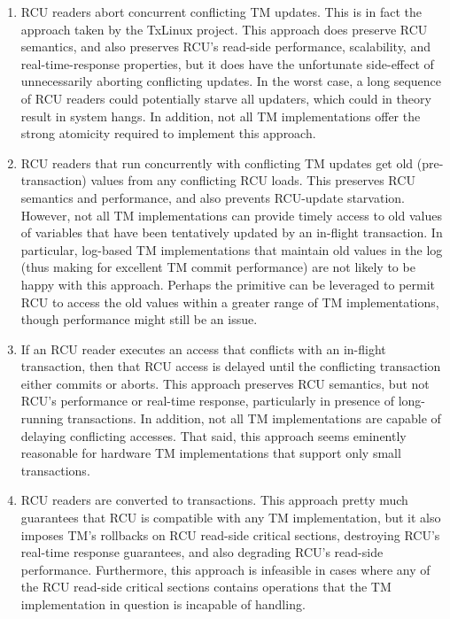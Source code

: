 \begin{enumerate}
\item	RCU readers abort concurrent conflicting TM updates.
	This is in fact the approach taken by the TxLinux project.
	This approach does preserve RCU semantics, and also preserves
	RCU's read-side performance, scalability, and real-time-response
	properties, but it does have the unfortunate side-effect of
	unnecessarily aborting conflicting updates.
	In the worst case, a long sequence of RCU readers could
	potentially starve all updaters, which could in theory result
	in system hangs.
	In addition, not all TM implementations offer the strong atomicity
	required to implement this approach.
\item	RCU readers that run concurrently with conflicting TM updates
	get old (pre-transaction) values from any conflicting RCU loads.
	This preserves RCU semantics and performance, and also prevents
	RCU-update starvation.
	However, not all TM implementations can provide timely access
	to old values of variables that have been tentatively updated
	by an in-flight transaction.
	In particular, log-based TM implementations that maintain
	old values in the log (thus making for excellent TM commit
	performance) are not likely to be happy with this approach.
	Perhaps the  primitive can be leveraged
	to permit RCU to access the old values within a greater range
	of TM implementations, though performance might still be an issue.
\item	If an RCU reader executes an access that conflicts with an
	in-flight transaction, then that RCU access is delayed until
	the conflicting transaction either commits or aborts.
	This approach preserves RCU semantics, but not RCU's performance
	or real-time response, particularly in presence of long-running
	transactions.
	In addition, not all TM implementations are capable of delaying
	conflicting accesses.
	That said, this approach seems eminently reasonable for hardware
	TM implementations that support only small transactions.
\item	RCU readers are converted to transactions.
	This approach pretty much guarantees that RCU is compatible with
	any TM implementation, but it also imposes TM's rollbacks on RCU
	read-side critical sections, destroying RCU's real-time response
	guarantees, and also degrading RCU's read-side performance.
	Furthermore, this approach is infeasible in cases where any of
	the RCU read-side critical sections contains operations that
	the TM implementation in question is incapable of handling.

\end{enumerate}
